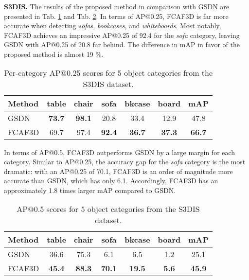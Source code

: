 \documentclass[runningheads]{llncs}
\begin{document}
\textbf{S3DIS.} The results of the proposed method in comparison with GSDN are presented in Tab. \ref{tab:s3dis25} and Tab. \ref{tab:s3dis50}. In terms of AP@0.25, FCAF3D is far more accurate when detecting \textit{sofas}, \textit{bookcases}, and \textit{whiteboards}. Most notably, FCAF3D achieves an impressive AP@0.25 of 92.4 for the \textit{sofa} category, leaving GSDN with AP@0.25 of 20.8 far behind. The difference in mAP in favor of the proposed method is almost 19 \%.

\begin{table}[!h]
    \centering \small
    \begingroup \setlength{\tabcolsep}{2.5pt}
    \begin{tabular}{l|ccccc|c}
    \hline
    Method & table & chair & sofa & bkcase & board & mAP \\ \hline
    GSDN\cite{gwak2020gsdn} & \textbf{73.7} & \textbf{98.1} & 20.8 & 33.4 & 12.9 & 47.8 \\
    FCAF3D & 69.7 & 97.4 & \textbf{92.4} & \textbf{36.7} & \textbf{37.3} & \textbf{66.7} \\ \hline
    \end{tabular} \endgroup
    \caption{Per-category AP@0.25 scores for 5 object categories from the S3DIS dataset.}
    \label{tab:s3dis25}
\end{table}

In terms of AP@0.5, FCAF3D outperforms GSDN by a large margin for each category. Similar to AP@0.25, the accuracy gap for the \textit{sofa} category is the most dramatic: with an AP@0.25 of 70.1, FCAF3D is an order of magnitude more accurate than GSDN, which has only 6.1. Accordingly, FCAF3D has an approximately 1.8 times larger mAP compared to GSDN.

\begin{table}[!h]
    \centering \small
    \begingroup \setlength{\tabcolsep}{2.5pt}
    \begin{tabular}{l|ccccc|c}
    \hline
    Method & table & chair & sofa & bkcase & board & mAP \\ \hline
    GSDN\cite{gwak2020gsdn} & 36.6 & 75.3 & \phantom{0}6.1 & \phantom{0}6.5 & \phantom{0}1.2 & 25.1 \\
    FCAF3D & \textbf{45.4} & \textbf{88.3} & \textbf{70.1} & \textbf{19.5} & \textbf{\phantom{0}5.6} & \textbf{45.9} \\ \hline
    \end{tabular} \endgroup
    \caption{AP@0.5 scores for 5 object categories from the S3DIS dataset.}
    \label{tab:s3dis50}
\end{table}
\end{document}
